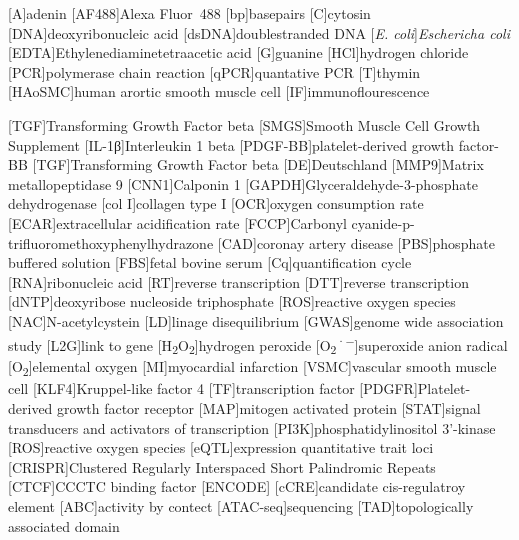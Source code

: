 \begin{acronym}
[A]{adenin}
[AF488]{Alexa Fluor\textsuperscript{\textregistered}~488}
[bp]{basepairs}
[C]{cytosin}
[DNA]{deoxyribonucleic acid}
[dsDNA]{doublestranded DNA}
[\textit{E. coli}]{\textit{Eschericha coli}}
[EDTA]{Ethylenediaminetetraacetic acid}
[G]{guanine}
[HCl]{hydrogen chloride}
[PCR]{polymerase chain reaction}
[qPCR]{quantative PCR}
[T]{thymin}
[HAoSMC]{human arortic smooth muscle cell}
[IF]{immunoflourescence}


[TGF\beta]{Transforming Growth Factor beta}
[SMGS]{Smooth Muscle Cell Growth Supplement}
[IL-1β]{Interleukin 1 beta}
[PDGF-BB]{platelet-derived growth factor-BB}
[TGF\beta]{Transforming Growth Factor beta}
[DE]{Deutschland}
[MMP9]{Matrix metallopeptidase 9}
[CNN1]{Calponin 1}
[GAPDH]{Glyceraldehyde-3-phosphate dehydrogenase}
[col I]{collagen type I}
[OCR]{oxygen consumption rate}
[ECAR]{extracellular acidification rate}
[FCCP]{Carbonyl cyanide-p-trifluoromethoxyphenylhydrazone}
[CAD]{coronay artery disease}
[PBS]{phosphate buffered solution}
[FBS]{fetal bovine serum}
[Cq]{quantification cycle}
[RNA]{ribonucleic acid}
[RT]{reverse transcription}
[DTT]{reverse transcription}
[dNTP]{deoxyribose nucleoside triphosphate}
[ROS]{reactive oxygen species}
[NAC]{N-acetylcystein}
[LD]{linage disequilibrium}
[GWAS]{genome wide association study}
[L2G]{link to gene}
[H\textsubscript{2}O\textsubscript{2}]{hydrogen peroxide}
[O\textsubscript{2}\textsuperscript{·−}]{superoxide anion radical}
[O\textsubscript{2}]{elemental oxygen}
[MI]{myocardial infarction}
[VSMC]{vascular smooth muscle cell}
[KLF4]{Kruppel-like factor 4}
[TF]{transcription factor}
[PDGFR]{Platelet-derived growth factor receptor}
[MAP]{mitogen activated protein}
[STAT]{signal transducers and activators of transcription}
[PI3K]{phosphatidylinositol 3'-kinase}
[ROS]{reactive oxygen species}
[eQTL]{expression quantitative trait loci}
[CRISPR]{Clustered Regularly Interspaced Short Palindromic Repeats}
[CTCF]{CCCTC binding factor}
[ENCODE]{}
[cCRE]{candidate cis-regulatroy element}
[ABC]{activity by contect}
[ATAC-seq]{sequencing}
[TAD]{topologically associated domain}


\end{acronym}

